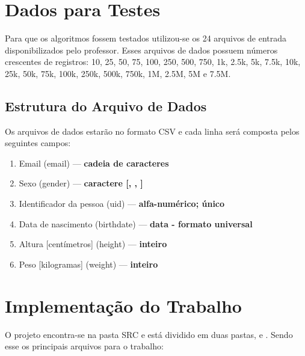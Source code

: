 \documentclass[a4paper,12pt]{scrartcl}
\begin{document}
\section{Dados para Testes}

Para que os algoritmos fossem testados utilizou-se os 24 arquivos de entrada disponibilizados pelo professor. Esses arquivos de dados possuem números crescentes de registros: 10, 25, 50, 75, 100, 250, 500, 750, 1k, 2.5k, 5k, 7.5k, 10k, 25k, 50k, 75k, 100k, 250k, 500k, 750k, 1M, 2.5M, 5M e 7.5M.


\subsection{Estrutura do Arquivo de Dados}

Os arquivos de dados estarão no formato CSV e cada linha será composta pelos seguintes campos:

\begin{enumerate}
    \item Email (email) --- \textbf{cadeia de caracteres}
    \item Sexo (gender) --- \textbf{caractere [, , ]}
    \item Identificador da pessoa (uid) --- \textbf{alfa-numérico; único}
    \item Data de nascimento (birthdate) --- \textbf{data - formato universal}\cite{}
    \item Altura [centímetros] (height) --- \textbf{inteiro}
    \item Peso [kilogramas] (weight) --- \textbf{inteiro}
\end{enumerate}

\section{Implementação do Trabalho}

O projeto encontra-se na pasta SRC e está dividido em duas pastas,  e . Sendo esse os principais arquivos para o trabalho:
\end{document}
